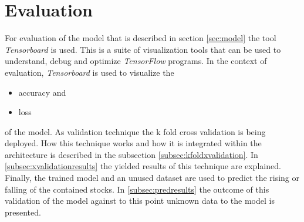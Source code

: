 \section{Evaluation}
\label{sec:evaluation}
For evaluation of the model that is described in section \ref{sec:model} the tool \textit{Tensorboard} is used. This is a suite of visualization tools that can be used to understand, debug and optimize \textit{TensorFlow} programs. In the context of evaluation, \textit{Tensorboard} is used to visualize the 
\begin{itemize}
	\item accuracy and 
	\item loss
\end{itemize}
of the model. As validation technique the k fold cross validation is being deployed. How this technique works and how it is integrated within the architecture is described in the subsection \ref{subsec:kfoldxvalidation}. In \ref{subsec:xvalidationresults} the yielded results of this technique are explained. Finally, the trained model and an unused dataset are used to predict the rising or falling of the contained stocks. In \ref{subsec:predresults} the outcome of this validation of the model against to this point unknown data to the model is presented. 


